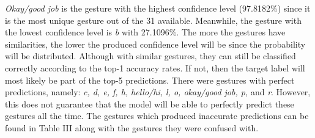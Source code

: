 \documentclass[journal]{./IEEE/IEEEtran}
\begin{document}
\indent \textit{Okay/good job} is the gesture with the highest confidence level (97.8182\%) since it is the most unique gesture out of the 31 available. Meanwhile, the gesture with the lowest confidence level is \textit{b} with 27.1096\%. The more the gestures have similarities, the lower the produced confidence level will be since the probability will be distributed. Although with similar gestures, they can still be classified correctly according to the top-1 accuracy rates. If not, then the target label will most likely be part of the top-5 predictions.
\newline
\indent There were gestures with perfect predictions, namely: \textit{c, d, e, f, h, hello/hi, l, o, okay/good job, p,} and \textit{r}. However, this does not guarantee that the model will be able to perfectly predict these gestures all the time. The gestures which produced inaccurate predictions can be found in Table III along with the gestures they were confused with.
\end{document}
